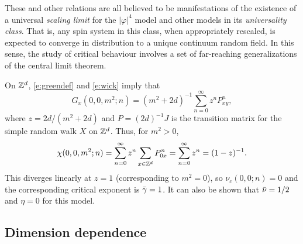 These and other relations are all believed to be manifestations of the existence of
a universal \emph{scaling limit} for the $|\varphi|^4$ model and other models in its
\emph{universality class}. That is, any spin system in this class, when appropriately
rescaled, is expected to converge in distribution to a unique continuum random field.
In this sense, the study of critical behaviour involves a set of far-reaching
generalizations of the central limit theorem.

\begin{example}
\label{ex:gff-asymp}
On ${ {{\mathbb Z}}^d }$, \eqref{e:greendef} and \eqref{e:wick} imply that
\begin{equation}
G_x(0, 0, m^2; n)
	=
(m^2 + 2 d)^{-1} \sum_{n=0}^\infty z^n P^n_{xy},
\end{equation}
where $z = 2 d / (m^2 + 2 d)$ and $P = (2 d)^{-1} J$
is the transition matrix for the simple random walk $X$ on ${ {{\mathbb Z}}^d }$.
Thus, for $m^2 > 0$,
\begin{equation}
\chi(0, 0, m^2; n)
  =
\sum_{n=0}^\infty z^n \sum_{x\in{ {{\mathbb Z}}^d }} P^n_{0x}
  =
\sum_{n=0}^\infty z^n
  =
(1 - z)^{-1}.
\end{equation}
This diverges linearly at $z = 1$ (corresponding to $m^2 = 0$),
so $\nu_c(0, 0; n) = 0$ and the corresponding critical exponent is
$\bar\gamma = 1$. It can also be shown that $\bar\nu = 1/2$ and $\eta = 0$ for this model.
\end{example}


\subsection{Dimension dependence}
\label{sec:dimension}

